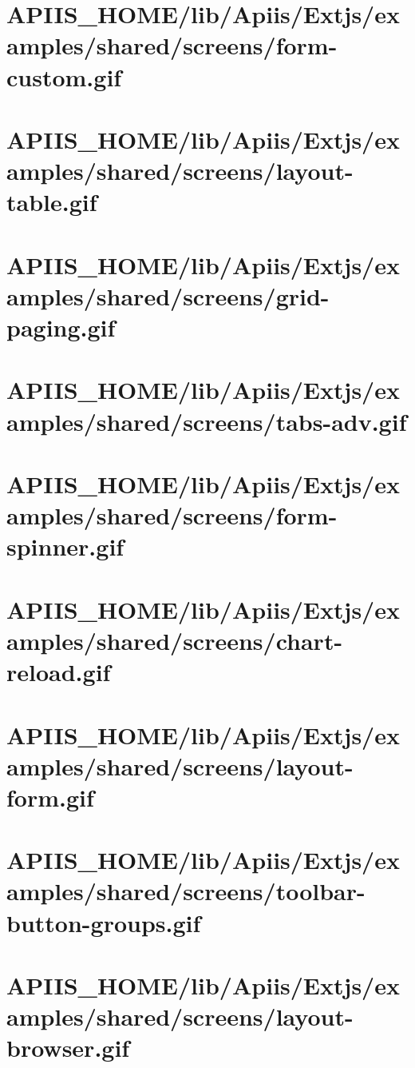 \section{APIIS\_HOME/lib/Apiis/Extjs/examples/shared/screens/form-custom.gif} 
\section{APIIS\_HOME/lib/Apiis/Extjs/examples/shared/screens/layout-table.gif} 
\section{APIIS\_HOME/lib/Apiis/Extjs/examples/shared/screens/grid-paging.gif} 
\section{APIIS\_HOME/lib/Apiis/Extjs/examples/shared/screens/tabs-adv.gif} 
\section{APIIS\_HOME/lib/Apiis/Extjs/examples/shared/screens/form-spinner.gif} 
\section{APIIS\_HOME/lib/Apiis/Extjs/examples/shared/screens/chart-reload.gif} 
\section{APIIS\_HOME/lib/Apiis/Extjs/examples/shared/screens/layout-form.gif} 
\section{APIIS\_HOME/lib/Apiis/Extjs/examples/shared/screens/toolbar-button-groups.gif} 
\section{APIIS\_HOME/lib/Apiis/Extjs/examples/shared/screens/layout-browser.gif} 
